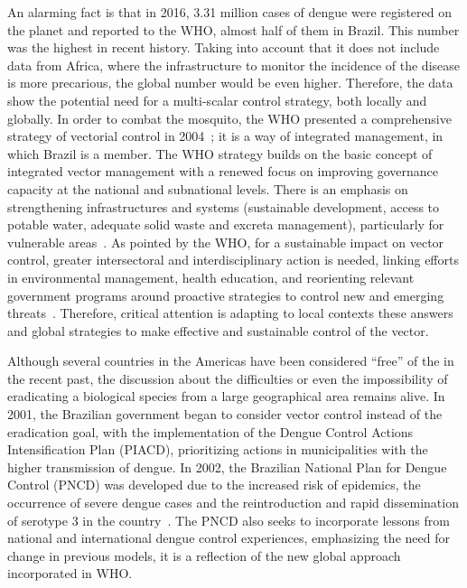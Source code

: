 An alarming fact is that in 2016, 3.31 million cases of dengue were registered on the planet and reported to the WHO, almost half of them in Brazil.
This number was the highest in recent history.
Taking into account that it does not include data from Africa, where the infrastructure to monitor the incidence of the disease is more precarious, the global number would be even higher.
Therefore, the data show the potential need for a multi-scalar \Aedes control strategy, both locally and globally.
In order to combat the mosquito, the WHO presented a comprehensive strategy of vectorial control in 2004~\cite{world2004global}; it is a way of integrated management, in which Brazil is a member.
%
The WHO strategy builds on the basic concept of integrated vector management with a renewed focus on improving governance capacity at the national and subnational levels.
There is an emphasis on strengthening infrastructures and systems (\eg sustainable development, access to potable water, adequate solid waste and excreta management), particularly for vulnerable areas~\cite{world2012global}.
As pointed by the WHO, for a sustainable impact on vector control, greater intersectoral and interdisciplinary action is needed, linking efforts in environmental management, health education, and reorienting relevant government programs around proactive strategies to control new and emerging threats~\cite{world2012global}.
Therefore, critical attention is adapting to local contexts these answers and global strategies to make effective and sustainable control of the vector.

Although several countries in the Americas have been considered “free” of the \Aedes in the recent past, the discussion about the difficulties or even the impossibility of eradicating a biological species from a large geographical area remains alive.
In 2001, the Brazilian government began to consider vector control instead of the eradication goal, with the implementation of the Dengue Control Actions Intensification Plan (PIACD), prioritizing actions in municipalities with the higher transmission of dengue. In 2002, the Brazilian National Plan for Dengue Control (PNCD) was developed due to the increased risk of epidemics, the occurrence of severe dengue cases and the reintroduction and rapid dissemination of serotype 3 in the country~\cite{web:pncdbrasil}.
The PNCD also seeks to incorporate lessons from national and international dengue control experiences, emphasizing the need for change in previous models, \ie it is a reflection of the new global approach incorporated in WHO.

